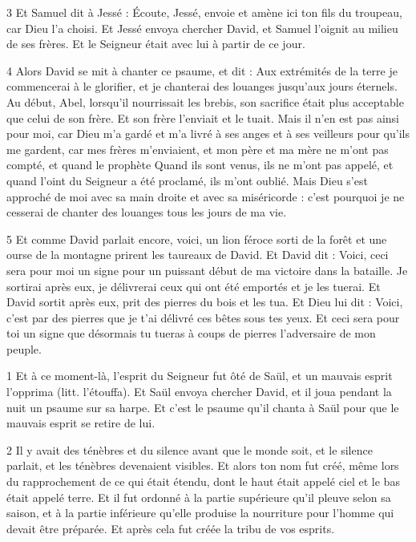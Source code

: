 \par 3 Et Samuel dit à Jessé : Écoute, Jessé, envoie et amène ici ton fils du troupeau, car Dieu l'a choisi. Et Jessé envoya chercher David, et Samuel l'oignit au milieu de ses frères. Et le Seigneur était avec lui à partir de ce jour.

\par 4 Alors David se mit à chanter ce psaume, et dit : Aux extrémités de la terre je commencerai à le glorifier, et je chanterai des louanges jusqu'aux jours éternels. Au début, Abel, lorsqu'il nourrissait les brebis, son sacrifice était plus acceptable que celui de son frère. Et son frère l'enviait et le tuait. Mais il n'en est pas ainsi pour moi, car Dieu m'a gardé et m'a livré à ses anges et à ses veilleurs pour qu'ils me gardent, car mes frères m'enviaient, et mon père et ma mère ne m'ont pas compté, et quand le prophète Quand ils sont venus, ils ne m'ont pas appelé, et quand l'oint du Seigneur a été proclamé, ils m'ont oublié. Mais Dieu s'est approché de moi avec sa main droite et avec sa miséricorde : c'est pourquoi je ne cesserai de chanter des louanges tous les jours de ma vie.

\par 5 Et comme David parlait encore, voici, un lion féroce sorti de la forêt et une ourse de la montagne prirent les taureaux de David. Et David dit : Voici, ceci sera pour moi un signe pour un puissant début de ma victoire dans la bataille. Je sortirai après eux, je délivrerai ceux qui ont été emportés et je les tuerai. Et David sortit après eux, prit des pierres du bois et les tua. Et Dieu lui dit : Voici, c'est par des pierres que je t'ai délivré ces bêtes sous tes yeux. Et ceci sera pour toi un signe que désormais tu tueras à coups de pierres l'adversaire de mon peuple.


\par 1 Et à ce moment-là, l'esprit du Seigneur fut ôté de Saül, et un mauvais esprit l'opprima (litt. l'étouffa). Et Saül envoya chercher David, et il joua pendant la nuit un psaume sur sa harpe. Et c'est le psaume qu'il chanta à Saül pour que le mauvais esprit se retire de lui.

\par 2 Il y avait des ténèbres et du silence avant que le monde soit, et le silence parlait, et les ténèbres devenaient visibles. Et alors ton nom fut créé, même lors du rapprochement de ce qui était étendu, dont le haut était appelé ciel et le bas était appelé terre. Et il fut ordonné à la partie supérieure qu'il pleuve selon sa saison, et à la partie inférieure qu'elle produise la nourriture pour l'homme qui devait être préparée. Et après cela fut créée la tribu de vos esprits.

